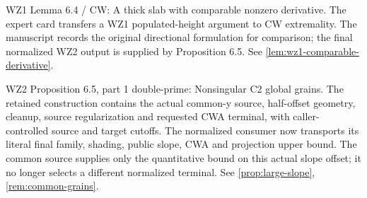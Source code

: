 \begin{remark}
\label{rem:atlas-L6_4}
WZ1 Lemma 6.4 / CW: A thick slab with comparable nonzero derivative.
The expert card transfers a WZ1 populated-height argument to CW extremality. The manuscript records the original directional formulation for comparison; the final normalized WZ2 output is supplied by Proposition 6.5.
See \ref{lem:wz1-comparable-derivative}.
\end{remark}

\begin{remark}
\label{rem:atlas-W2P6_5}
WZ2 Proposition 6.5, part 1 double-prime: Nonsingular C2 global grains.
The retained construction contains the actual common-y source, half-offset geometry, cleanup, source regularization and requested CWA terminal, with caller-controlled source and target cutoffs. The normalized consumer now transports its literal final family, shading, public slope, CWA and projection upper bound. The common source supplies only the quantitative bound on this actual slope offset; it no longer selects a different normalized terminal.
See \ref{prop:large-slope}, \ref{rem:common-grains}.
\end{remark}

